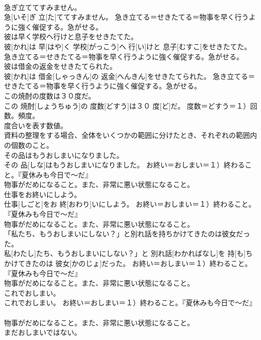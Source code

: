 \documentclass[8pt]{extreport}
\begin{document}
\begin{CJK}{UTF8}{min}
{\\	急ぎ立ててすみません。	
\\	急[いそ]ぎ 立[た]ててすみません。	急き立てる＝せきたてる＝物事を早く行うように強く催促する。急がせる。
\\	彼は早く学校ヘ行けと息子をせきたてた。	
\\	彼[かれ]は 早[はや]く 学校[がっこう]ヘ 行[い]けと 息子[むすこ]をせきたてた。	急き立てる＝せきたてる＝物事を早く行うように強く催促する。急がせる。
\\	彼は借金の返金をせきたてられた。	
\\	彼[かれ]は 借金[しゃっきん]の 返金[へんきん]をせきたてられた。	急き立てる＝せきたてる＝物事を早く行うように強く催促する。急がせる。
\\	この焼酎の度数は３０度だ。	
\\	この 焼酎[しょうちゅう]の 度数[どすう]は３０ 度[ど]だ。	度数＝どすう＝１）回数。頻度。 　　　　　　　
\\	度合いを表す数値。 　　　　　　　
\\	資料の整理をする場合、全体をいくつかの範囲に分けたとき、それぞれの範囲内の個数のこと。
\\	その品はもうおしまいになりました。	
\\	その 品[しな]はもうおしまいになりました。	お終い＝おしまい＝１）終わること。『夏休みも今日で〜だ』 　　　　　　　　　
\\	物事がだめになること。また、非常に悪い状態になること。
\\	仕事をお終いにしよう。	
\\	仕事[しごと]をお 終[おわり]いにしよう。	お終い＝おしまい＝１）終わること。『夏休みも今日で〜だ』 　　　　　　　　　
\\	物事がだめになること。また、非常に悪い状態になること。
\\	「私たち、もうおしまいにしない？」と別れ話を持ちかけてきたのは彼女だった。	
\\	私[わたし]たち、もうおしまいにしない？」と 別れ話[わかればなし]を 持[も]ちかけてきたのは 彼女[かのじょ]だった。	お終い＝おしまい＝１）終わること。『夏休みも今日で〜だ』 　　　　　　　　　
\\	物事がだめになること。また、非常に悪い状態になること。
\\	これでおしまい。	
\\	これでおしまい。	お終い＝おしまい＝１）終わること。『夏休みも今日で〜だ』 　　　　　　　　　
\\	物事がだめになること。また、非常に悪い状態になること。
\\	まだおしまいではない。	
}
\end{CJK}
\end{document}
